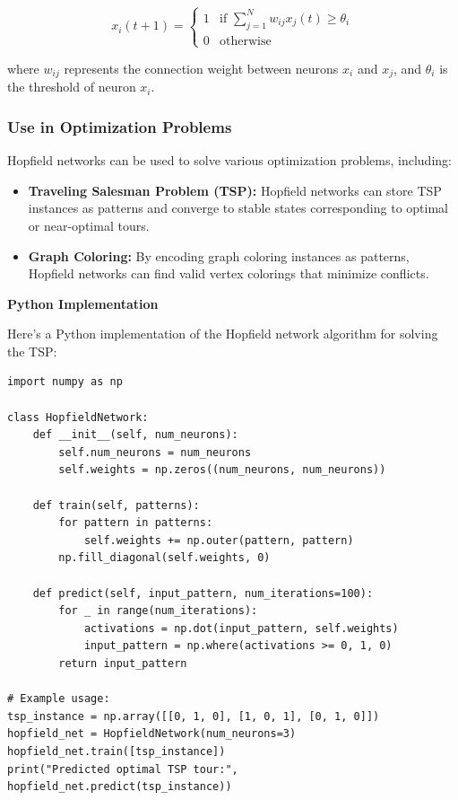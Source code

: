 \documentclass[12pt]{book} %
\begin{document}
\[
x_i(t+1) = \begin{cases} 
1 & \text{if } \sum_{j=1}^{N} w_{ij}x_j(t) \geq \theta_i \\
0 & \text{otherwise}
\end{cases}
\]

where $w_{ij}$ represents the connection weight between neurons $x_i$ and $x_j$, and $\theta_i$ is the threshold of neuron $x_i$.

\subsubsection{Use in Optimization Problems}

Hopfield networks can be used to solve various optimization problems, including:
\begin{itemize}
    \item \textbf{Traveling Salesman Problem (TSP):} Hopfield networks can store TSP instances as patterns and converge to stable states corresponding to optimal or near-optimal tours.
    \item \textbf{Graph Coloring:} By encoding graph coloring instances as patterns, Hopfield networks can find valid vertex colorings that minimize conflicts.
\end{itemize}

\FloatBarrier
\textbf{Python Implementation}

Here's a Python implementation of the Hopfield network algorithm for solving the TSP:
\FloatBarrier
\begin{lstlisting}
import numpy as np

class HopfieldNetwork:
    def __init__(self, num_neurons):
        self.num_neurons = num_neurons
        self.weights = np.zeros((num_neurons, num_neurons))
    
    def train(self, patterns):
        for pattern in patterns:
            self.weights += np.outer(pattern, pattern)
        np.fill_diagonal(self.weights, 0)
    
    def predict(self, input_pattern, num_iterations=100):
        for _ in range(num_iterations):
            activations = np.dot(input_pattern, self.weights)
            input_pattern = np.where(activations >= 0, 1, 0)
        return input_pattern

# Example usage:
tsp_instance = np.array([[0, 1, 0], [1, 0, 1], [0, 1, 0]])
hopfield_net = HopfieldNetwork(num_neurons=3)
hopfield_net.train([tsp_instance])
print("Predicted optimal TSP tour:", hopfield_net.predict(tsp_instance))
\end{lstlisting}
\FloatBarrier
\end{document}
